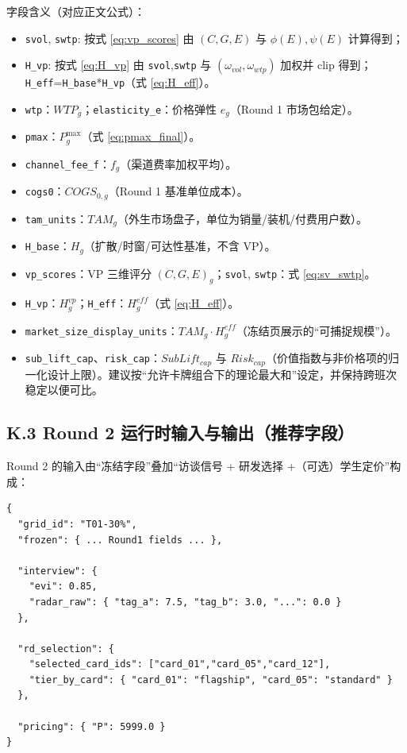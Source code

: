 \documentclass[UTF8,12pt]{ctexart}
\begin{document}
字段含义（对应正文公式）：
\begin{itemize}

\item \texttt{svol}, \texttt{swtp}: 按式 \eqref{eq:vp_scores} 由 $(C,G,E)$ 与 $\phi(E),\psi(E)$ 计算得到；
\item \texttt{H\_vp}: 按式 \eqref{eq:H_vp} 由 \texttt{svol},\texttt{swtp} 与 $(\omega_{vol},\omega_{wtp})$ 加权并 clip 得到；\texttt{H\_eff}=\texttt{H\_base}*\texttt{H\_vp}（式 \eqref{eq:H_eff}）。


  \item \texttt{wtp}：$WTP_g$；\texttt{elasticity\_e}：价格弹性 $e_g$（Round 1 市场包给定）。
  \item \texttt{pmax}：$P^{\max}_g$（式 \eqref{eq:pmax_final}）。
  \item \texttt{channel\_fee\_f}：$f_g$（渠道费率加权平均）。
  \item \texttt{cogs0}：$COGS_{0,g}$（Round 1 基准单位成本）。
  \item \texttt{tam\_units}：$TAM_g$（外生市场盘子，单位为销量/装机/付费用户数）。
  \item \texttt{H\_base}：$H_g$（扩散/时窗/可达性基准，不含 VP）。
  \item \texttt{vp\_scores}：VP 三维评分 $(C,G,E)_g$；\texttt{svol}, \texttt{swtp}：式 \eqref{eq:sv_swtp}。
  \item \texttt{H\_vp}：$H^{vp}_g$；\texttt{H\_eff}：$H^{eff}_g$（式 \eqref{eq:H_eff}）。
  \item \texttt{market\_size\_display\_units}：$TAM_g\cdot H^{eff}_g$（冻结页展示的“可捕捉规模”）。
  \item \texttt{sub\_lift\_cap}、\texttt{risk\_cap}：$SubLift_{cap}$ 与 $Risk_{cap}$（价值指数与非价格项的归一化设计上限）。建议按“允许卡牌组合下的理论最大和”设定，并保持跨班次稳定以便可比。
\end{itemize}


\subsection{K.3 Round 2 运行时输入与输出（推荐字段）}
Round 2 的输入由“冻结字段”叠加“访谈信号 + 研发选择 +（可选）学生定价”构成：
\begin{verbatim}
{
  "grid_id": "T01-30%",
  "frozen": { ... Round1 fields ... },

  "interview": {
    "evi": 0.85,
    "radar_raw": { "tag_a": 7.5, "tag_b": 3.0, "...": 0.0 }
  },

  "rd_selection": {
    "selected_card_ids": ["card_01","card_05","card_12"],
    "tier_by_card": { "card_01": "flagship", "card_05": "standard" }
  },

  "pricing": { "P": 5999.0 }
}
\end{verbatim}
\end{document}
